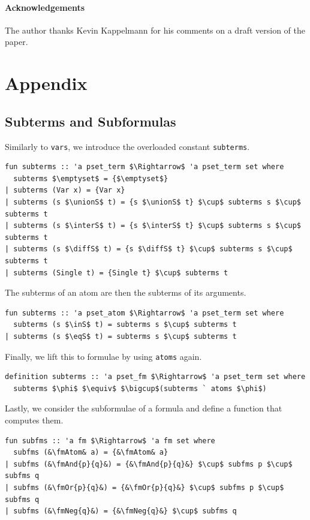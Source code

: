 \documentclass[runningheads]{llncs}
\newcommand{\unionS}{\sqcup_\text{s}}
\newcommand{\interS}{\sqcap_\text{s}}
\newcommand{\diffS}{-_\text{s}}
\newcommand{\inS}{\in_\text{s}}
\newcommand{\eqS}{=_\text{s}}
\newcommand{\fmAndSymbol}{\boldsymbol{\land}}
\newcommand{\fmAnd}[2]{#1 $\fmAndSymbol$ #2}
\newcommand{\fmOr}[2]{#1 $\boldsymbol{\lor}$ #2}
\newcommand{\fmNegSymbol}{\boldsymbol{\neg}}
\newcommand{\fmNeg}[1]{$\fmNegSymbol\:$#1}
\newcommand{\fmAtom}{\textbf{A}}
\begin{document}
\subsubsection{Acknowledgements}
The author thanks Kevin Kappelmann for his comments on a draft version of the paper.



\appendix

\clearpage\chapter*{Appendix}

\section{Subterms and Subformulas}

Similarly to \lstinline!vars!, we introduce the overloaded constant \lstinline!subterms!.
\begin{lstlisting}
fun subterms :: 'a pset_term $\Rightarrow$ 'a pset_term set where
  subterms $\emptyset$ = {$\emptyset$}
| subterms (Var x) = {Var x}
| subterms (s $\unionS$ t) = {s $\unionS$ t} $\cup$ subterms s $\cup$ subterms t
| subterms (s $\interS$ t) = {s $\interS$ t} $\cup$ subterms s $\cup$ subterms t
| subterms (s $\diffS$ t) = {s $\diffS$ t} $\cup$ subterms s $\cup$ subterms t
| subterms (Single t) = {Single t} $\cup$ subterms t
\end{lstlisting}
The subterms of an atom are then the subterms of its arguments.
\begin{lstlisting}
fun subterms :: 'a pset_atom $\Rightarrow$ 'a pset_term set where
  subterms (s $\inS$ t) = subterms s $\cup$ subterms t
| subterms (s $\eqS$ t) = subterms s $\cup$ subterms t
\end{lstlisting}
Finally, we lift this to formulae by using \lstinline!atoms! again.
\begin{lstlisting}
definition subterms :: 'a pset_fm $\Rightarrow$ 'a pset_term set where
  subterms $\phi$ $\equiv$ $\bigcup$(subterms ` atoms $\phi$)
\end{lstlisting}

Lastly, we consider the subformulae of a formula and define a function that computes them.
\begin{lstlisting}
fun subfms :: 'a fm $\Rightarrow$ 'a fm set where
  subfms (&\fmAtom& a) = {&\fmAtom& a}
| subfms (&\fmAnd{p}{q}&) = {&\fmAnd{p}{q}&} $\cup$ subfms p $\cup$ subfms q
| subfms (&\fmOr{p}{q}&) = {&\fmOr{p}{q}&} $\cup$ subfms p $\cup$ subfms q
| subfms (&\fmNeg{q}&) = {&\fmNeg{q}&} $\cup$ subfms q
\end{lstlisting}
\end{document}
